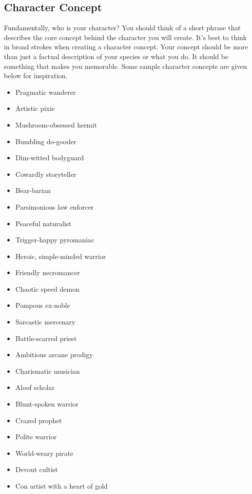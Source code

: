     \subsection{Character Concept}

        Fundamentally, who is your character?
        You should think of a short phrase that describes the core concept behind the character you will create.
        It's best to think in broad strokes when creating a character concept.
        Your concept should be more than just a factual description of your species or what you do.
        It should be something that makes you memorable.
        Some sample character concepts are given below for inspiration.

        \begin{itemize}
            \item Pragmatic wanderer
            \item Artistic pixie
            \item Mushroom-obsessed hermit
            \item Bumbling do-gooder
            \item Dim-witted bodyguard
            \item Cowardly storyteller
            \item Bear-barian
            \item Parsimonious law enforcer
            \item Peaceful naturalist
            \item Trigger-happy pyromaniac
            \item Heroic, simple-minded warrior
            \item Friendly necromancer
            \item Chaotic speed demon
            \item Pompous ex-noble
            \item Sarcastic mercenary
            \item Battle-scarred priest
            \item Ambitious arcane prodigy
            \item Charismatic musician
            \item Aloof scholar
            \item Blunt-spoken warrior
            \item Crazed prophet
            \item Polite warrior
            \item World-weary pirate
            \item Devout cultist
            \item Con artist with a heart of gold
        \end{itemize}

